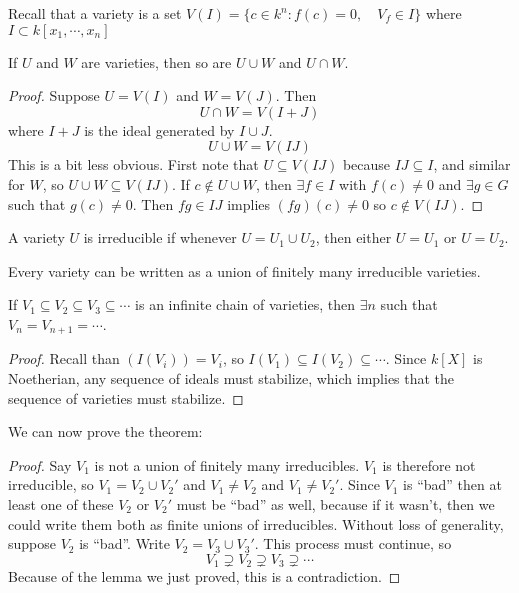 \documentclass[a4paper,twoside,master.tex]{subfiles}
\begin{document}


Recall that a variety is a set $ V(I) = \{c \in k^n \colon f(c) = 0,\quad V_f \in I\} $ where $ I \subset k[x_1, \cdots, x_n] $ 
\begin{claim}
    If $ U $ and $ W $ are varieties, then so are $ U \cup W $ and $ U \cap W $.
\end{claim}
\begin{proof}
    Suppose $ U = V(I) $ and $ W = V(J) $. Then
    \begin{equation}
        U \cap W = V(I + J)
    \end{equation}
    where $ I + J $ is the ideal generated by $ I \cup J $.
    \begin{equation}
        U \cup W = V(IJ)
    \end{equation}
    This is a bit less obvious. First note that $ U \subseteq V(IJ) $ because $ IJ \subseteq I $, and similar for $ W $, so $ U \cup W \subseteq V(IJ) $. If $ c \not\in U \cup W $, then $ \exists f \in I $ with $ f(c) \neq 0 $ and $ \exists g \in G $ such that $ g(c) \neq 0 $. Then $ fg \in IJ $ implies $ (fg)(c) \neq 0 $ so $ c \not\in V(IJ) $.
\end{proof}

\begin{definition}
    A variety $ U $ is irreducible if whenever $ U = U_1 \cup U_2 $, then either $ U = U_1 $ or $ U = U_2 $.
\end{definition}

\begin{theorem}
    Every variety can be written as a union of finitely many irreducible varieties.
\end{theorem}
\begin{lemma}
    If $ V_1 \subseteq V_2 \subseteq V_3 \subseteq \cdots $ is an infinite chain of varieties, then $ \exists n $ such that $ V_n = V_{n+1} = \cdots $.
\end{lemma}
\begin{proof}
    Recall than $ (I(V_i)) = V_i $, so $ I(V_1) \subseteq I(V_2) \subseteq \cdots $. Since $ k[X] $ is Noetherian, any sequence of ideals must stabilize, which implies that the sequence of varieties must stabilize.
\end{proof}
We can now prove the theorem:
\begin{proof}
    Say $ V_1 $ is not a union of finitely many irreducibles. $ V_1 $ is therefore not irreducible, so $ V_1 = V_2 \cup V_2' $ and $ V_1 \neq V_2 $ and $ V_1 \neq V_2' $. Since $ V_1 $ is ``bad'' then at least one of these $ V_2 $ or $ V_2' $ must be ``bad'' as well, because if it wasn't, then we could write them both as finite unions of irreducibles. Without loss of generality, suppose $ V_2 $ is ``bad''. Write $ V_2 = V_3 \cup V_3' $. This process must continue, so
    \begin{equation}
        V_1 \supsetneq V_2 \supsetneq V_3 \supsetneq \cdots
    \end{equation}
    Because of the lemma we just proved, this is a contradiction.
\end{proof}
\end{document}
